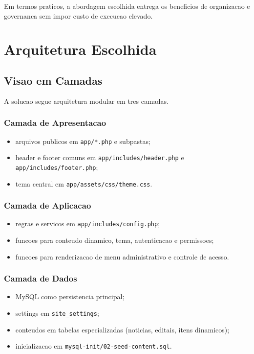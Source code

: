 \documentclass[12pt,a4paper]{article}
\begin{document}
Em termos praticos, a abordagem escolhida entrega os beneficios de organizacao e governanca sem impor custo de execucao elevado.

\section{Arquitetura Escolhida}
\subsection{Visao em Camadas}
A solucao segue arquitetura modular em tres camadas.

\subsubsection{Camada de Apresentacao}
\begin{itemize}
\item arquivos publicos em \texttt{app/*.php} e subpastas;
\item header e footer comuns em \texttt{app/includes/header.php} e \texttt{app/includes/footer.php};
\item tema central em \texttt{app/assets/css/theme.css}.
\end{itemize}

\subsubsection{Camada de Aplicacao}
\begin{itemize}
\item regras e servicos em \texttt{app/includes/config.php};
\item funcoes para conteudo dinamico, tema, autenticacao e permissoes;
\item funcoes para renderizacao de menu administrativo e controle de acesso.
\end{itemize}

\subsubsection{Camada de Dados}
\begin{itemize}
\item MySQL como persistencia principal;
\item settings em \texttt{site\_settings};
\item conteudos em tabelas especializadas (noticias, editais, itens dinamicos);
\item inicializacao em \texttt{mysql-init/02-seed-content.sql}.
\end{itemize}
\end{document}
